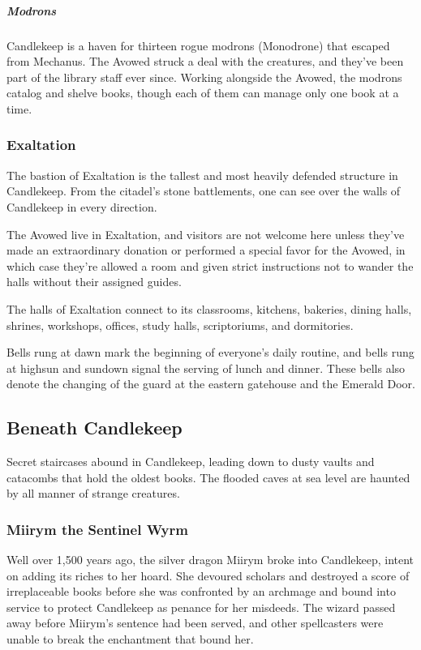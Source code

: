 \documentclass[10pt,a4paper,twoside,bg=print,twocolumn,openany,nodeprecatedcode]{dndbook}
\begin{document}
\subparagraph{Modrons}
Candlekeep is a haven for thirteen rogue modrons (Monodrone) that escaped from Mechanus. The Avowed struck a deal with the creatures, and they've been part of the library staff ever since. Working alongside the Avowed, the modrons catalog and shelve books, though each of them can manage only one book at a time.

\subsubsection{Exaltation}
The bastion of Exaltation is the tallest and most heavily defended structure in Candlekeep. From the citadel's stone battlements, one can see over the walls of Candlekeep in every direction.

The Avowed live in Exaltation, and visitors are not welcome here unless they've made an extraordinary donation or performed a special favor for the Avowed, in which case they're allowed a room and given strict instructions not to wander the halls without their assigned guides.

The halls of Exaltation connect to its classrooms, kitchens, bakeries, dining halls, shrines, workshops, offices, study halls, scriptoriums, and dormitories.

Bells rung at dawn mark the beginning of everyone's daily routine, and bells rung at highsun and sundown signal the serving of lunch and dinner. These bells also denote the changing of the guard at the eastern gatehouse and the Emerald Door.

\subsection{Beneath Candlekeep}
Secret staircases abound in Candlekeep, leading down to dusty vaults and catacombs that hold the oldest books. The flooded caves at sea level are haunted by all manner of strange creatures.

\subsubsection{Miirym the Sentinel Wyrm}
Well over 1,500 years ago, the silver dragon Miirym broke into Candlekeep, intent on adding its riches to her hoard. She devoured scholars and destroyed a score of irreplaceable books before she was confronted by an archmage and bound into service to protect Candlekeep as penance for her misdeeds. The wizard passed away before Miirym's sentence had been served, and other spellcasters were unable to break the enchantment that bound her.
\end{document}
